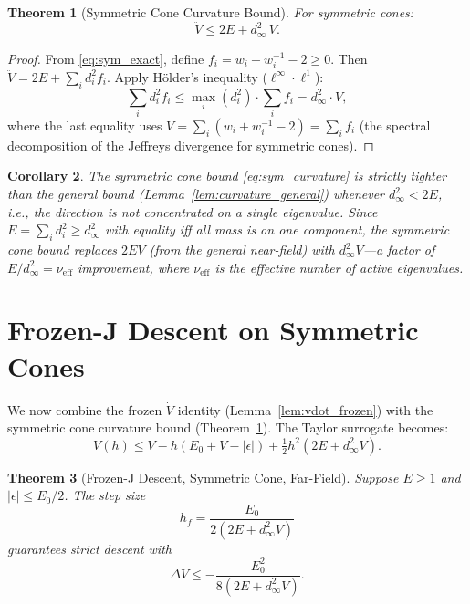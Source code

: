 \documentclass[11pt]{article}
\newtheorem{theorem}{Theorem}
\newtheorem{corollary}[theorem]{Corollary}
\begin{document}
\begin{theorem}[Symmetric Cone Curvature Bound]
\label{thm:sym_curvature}
For symmetric cones:
\begin{equation} \label{eq:sym_curvature}
    \ddot{V} \le 2E + d_\infty^2\, V.
\end{equation}
\end{theorem}

\begin{proof}
From \eqref{eq:sym_exact}, define $f_i = w_i + w_i^{-1} - 2 \ge 0$.
Then $\ddot{V} = 2E + \sum_i d_i^2 f_i$.  Apply H\"older's inequality
($\ell^\infty \cdot \ell^1$):
\begin{equation}
    \sum_i d_i^2 f_i \le \max_i(d_i^2) \cdot \sum_i f_i
    = d_\infty^2 \cdot V,
\end{equation}
where the last equality uses $V = \sum_i (w_i + w_i^{-1} - 2) = \sum_i f_i$
(the spectral decomposition of the Jeffreys divergence for symmetric
cones).
\end{proof}

\begin{corollary}
The symmetric cone bound \eqref{eq:sym_curvature} is strictly tighter
than the general bound (Lemma~\ref{lem:curvature_general}) whenever
$d_\infty^2 < 2E$, i.e., the direction is not concentrated on a single
eigenvalue.  Since $E = \sum_i d_i^2 \ge d_\infty^2$ with equality
iff all mass is on one component, the symmetric cone bound replaces
$2EV$ (from the general near-field) with $d_\infty^2 V$---a factor
of $E/d_\infty^2 = \nu_{\text{eff}}$ improvement, where
$\nu_{\text{eff}}$ is the effective number of active eigenvalues.
\end{corollary}

\section{Frozen-J Descent on Symmetric Cones}

We now combine the frozen $\dot{V}$ identity
(Lemma~\ref{lem:vdot_frozen}) with the symmetric cone curvature bound
(Theorem~\ref{thm:sym_curvature}).  The Taylor surrogate becomes:
\begin{equation} \label{eq:taylor_sym}
    V(h) \le V - h(E_0 + V - |\epsilon|) + \tfrac{1}{2}h^2(2E + d_\infty^2 V).
\end{equation}

\begin{theorem}[Frozen-J Descent, Symmetric Cone, Far-Field]
\label{thm:sym_farfield}
Suppose $E \ge 1$ and $|\epsilon| \le E_0/2$.  The step size
\begin{equation}
    h_f = \frac{E_0}{2(2E + d_\infty^2 V)}
\end{equation}
guarantees strict descent with
\begin{equation}
    \Delta V \le -\frac{E_0^2}{8(2E + d_\infty^2 V)}.
\end{equation}
\end{theorem}
\end{document}
